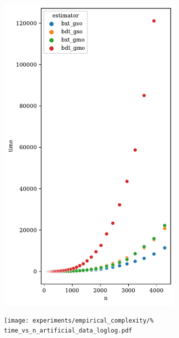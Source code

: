 \begin{figure}[tb]
    \centering
    \begin{subfigure}{0.49\textwidth}
        \includegraphics[width=\textwidth]{
            experiments/empirical_complexity/time_vs_n_artificial_data.pdf
        }
    \end{subfigure}
    \begin{subfigure}{0.49\textwidth}
        \texttt{[image: 
            experiments/empirical\_complexity/\%
            time\_vs\_n\_artificial\_data\_loglog.pdf
}
\end{subfigure}
\end{figure}
